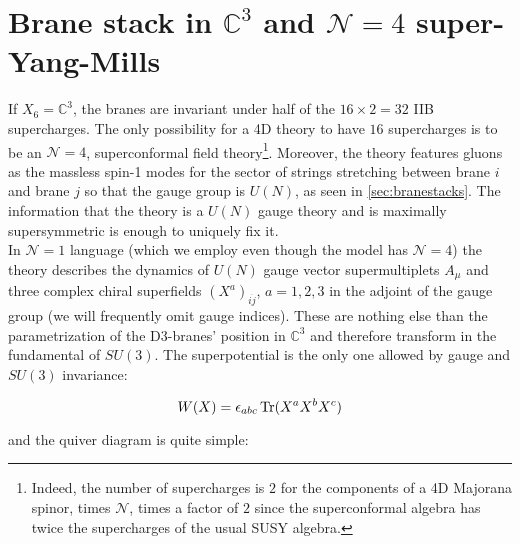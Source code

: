 \section{Brane stack in $\mathbb{C}^3$ and $\mathcal{N}=4$ super-Yang-Mills}

If $X_6 = \mathbb{C}^3$, the branes are invariant under half of the $16 \times 2 = 32$ IIB supercharges. The only possibility for a 4D theory to have $16$ supercharges is to be an $\mathcal{N}=4$, superconformal field theory\footnote{Indeed, the number of supercharges is $2$ for the components of a 4D Majorana spinor, times $\mathcal{N}$, times a factor of $2$ since the superconformal algebra has twice the supercharges of the usual SUSY algebra.}. Moreover, the theory features gluons as the massless spin-1 modes for the sector of strings stretching between brane $i$ and brane $j$ so that the gauge group is $U(N)$, as seen in \ref{sec:branestacks}. The information that the theory is a $U(N)$ gauge theory and is maximally supersymmetric is enough to uniquely fix it.\\

In $\mathcal{N}=1$ language (which we employ even though the model has $\mathcal{N}=4$) the theory describes the dynamics of $U(N)$ gauge vector supermultiplets $A_\mu$ and three complex chiral superfields $(X^a)_{i\dot j}$, $a=1,2,3$ in the adjoint of the gauge group (we will frequently omit gauge indices). These are nothing else than the parametrization of the D3-branes' position in $\mathbb{C}^3$ and therefore transform in the fundamental of $SU(3)$. The superpotential is the only one allowed by gauge and $SU(3)$ invariance:

\begin{equation} W(X) = \epsilon_{abc} \operatorname{Tr} ( X^a X^b X^c) \end{equation}

and the quiver diagram is quite simple:


\begin{figure}[!h]
	\centering
{}
\end{figure}

